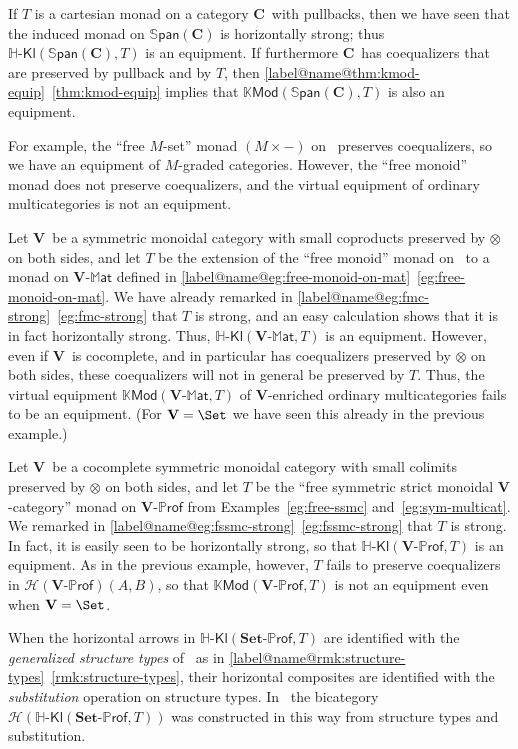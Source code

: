 \documentclass{tac}
\makeatletter
\newcommand{\V}{\ensuremath{\mathbf{V}}}
\newcommand{\C}{\ensuremath{\mathbf{C}}}
\newcommand{\calH}{\ensuremath{\mathcal{H}}}
\newcommand{\mb}[1]{{\mathbf{#1}}}
\newcommand{\MAT}[1]{\mathbf{#1}\mbox{-}\mathbb{M}\mathsf{at}}
\newcommand{\PROF}[1]{\mathbf{#1}\mbox{-}\mathbb{P}\mathsf{rof}}
\newcommand{\SPAN}[1]{\mathbb{S}\mathsf{pan}\!\left(\mb{#1}\right)}
\newcommand{\KMod}{\mathbb{K}\mathsf{Mod}}
\newcommand{\Hkl}[2]{\mathbb{H}\text{-}\mathsf{Kl}(\mathbb{#1},#2)}
\newcommand{\HKl}{\mathbb{H}\text{-}\mathsf{Kl}}
\numberwithin{equation}{section}
\def\currthmtype{}
\def\autoref#1{\ref*{label@name@#1}~\ref{#1}}
\def\autoref#1{\ref{label@name@#1}~\ref{#1}}
\let\old@label\label
\def\label#1{%
    {\let\your@currentlabel\@currentlabel%
      \edef\@currentlabel{\currthmtype}%
      \old@label{label@name@#1}}%
    \old@label{#1}}
\makeatother
\begin{document}
\begin{example}
  If $T$ is a cartesian monad on a category \C\ with pullbacks, then
  we have seen that the induced monad on $\SPAN{C}$ is horizontally
  strong; thus $\HKl(\SPAN{C},T)$ is an equipment.  If furthermore \C\
  has coequalizers that are preserved by pullback and by $T$, then
  \autoref{thm:kmod-equip} implies that $\KMod(\SPAN{C},T)$ is also an
  equipment.

  For example, the ``free $M$-set'' monad $(M\times -)$ on \Set\
  preserves coequalizers, so we have an equipment of $M$-graded
  categories.
  However, the ``free monoid'' monad does not preserve coequalizers, and
  the virtual equipment of ordinary multicategories is not an equipment.
\end{example}

\begin{example}\label{eg:fmc-hstrong}
  Let \V\ be a symmetric monoidal category with small coproducts
  preserved by $\otimes$ on both sides, and let $T$ be the extension of
  the ``free monoid'' monad on \Set\ to a monad on $\MAT{V}$ defined in
  \autoref{eg:free-monoid-on-mat}.
  We have already remarked in \autoref{eg:fmc-strong} that $T$ is
  strong, and an easy calculation shows that it is in fact horizontally
  strong.
  Thus, $\Hkl{\MAT{V}}{T}$ is an equipment.
  However, even if \V\ is cocomplete, and in particular has coequalizers
  preserved by $\otimes$ on both sides, these coequalizers will not in
  general be preserved by $T$.
  Thus, the virtual equipment $\KMod(\MAT{V},T)$ of \V-enriched ordinary
  multicategories fails to be an equipment.
  (For $\V=\Set$ we have seen this already in the previous example.)
\end{example}

\begin{example}\label{eg:lawvth-hstrong}
  Let \V\ be a cocomplete symmetric monoidal category with small
  colimits preserved by $\otimes$ on both sides, and let $T$ be the
  ``free symmetric strict monoidal \V-category'' monad on $\PROF{V}$
  from Examples~\ref{eg:free-ssmc} and~\ref{eg:sym-multicat}.
  We remarked in \autoref{eg:fssmc-strong} that $T$ is strong.  In fact,
  it is easily seen to be horizontally strong, so that
  $\Hkl{\PROF{V}}{T}$ is an equipment.
  As in the previous example, however, $T$ fails to preserve
  coequalizers in $\calH(\PROF{V})(A,B)$, so that $\KMod(\PROF{V},T)$ is
  not an equipment even when $\V=\Set$.

  When the horizontal arrows in $\Hkl{\PROF{Set}}{T}$ are identified
  with the \emph{generalized structure types} of~\cite{fghw:gen-species}
  as in \autoref{rmk:structure-types}, their horizontal composites are
  identified with the \emph{substitution} operation on structure types.
  In~\cite{fghw:gen-species} the bicategory $\calH(\Hkl{\PROF{Set}}{T})$
  was constructed in this way from structure types and substitution.
\end{example}
\end{document}
